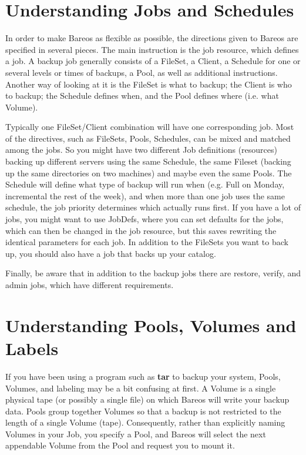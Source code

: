 \label{JobsandSchedules}
\section{Understanding Jobs and Schedules}

In order to make Bareos as flexible as possible, the directions given
to Bareos are specified in several pieces.  The main instruction is the
job resource, which defines a job.  A backup job generally consists of a
FileSet, a Client, a Schedule for one or several levels or times of backups,
a Pool, as well as additional instructions. Another way of looking
at it is the FileSet is what to backup; the Client is who to backup; the
Schedule defines when, and the Pool defines where (i.e. what Volume).

Typically one FileSet/Client combination will have one corresponding job.
Most of the directives, such as FileSets, Pools, Schedules, can be mixed
and matched among the jobs.  So you might have two different Job
definitions (resources) backing up different servers using the same
Schedule, the same Fileset (backing up the same directories on two machines)
and maybe even the same Pools.  The Schedule will define what type of
backup will run when (e.g. Full on Monday, incremental the rest of the
week), and when more than one job uses the same schedule, the job priority
determines which actually runs first.  If you have a lot of jobs, you might
want to use JobDefs, where you can set defaults for the jobs, which can
then be changed in the job resource, but this saves rewriting the
identical parameters for each job.  In addition to the FileSets you want to
back up, you should also have a job that backs up your catalog.

Finally, be aware that in addition to the backup jobs there are
restore, verify, and admin jobs, which have different requirements.

\label{PoolsVolsLabels}
\section{Understanding Pools, Volumes and Labels}

If you have been using a program such as {\bf tar} to backup your system,
Pools, Volumes, and labeling may be a bit confusing at first. A Volume is a
single physical tape (or possibly a single file) on which Bareos will write
your backup data. Pools group together Volumes so that a backup is not
restricted to the length of a single Volume (tape). Consequently, rather than
explicitly naming Volumes in your Job, you specify a Pool, and Bareos will
select the next appendable Volume from the Pool and request you to mount it.

